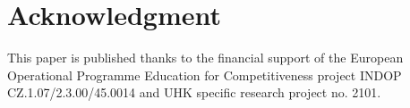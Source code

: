 
\section*{Acknowledgment}

This paper is published thanks to the financial support of the European Operational Programme Education for Competitiveness project INDOP CZ.1.07/2.3.00/45.0014 and UHK specific research project no. 2101.

